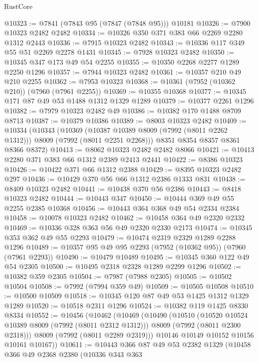 \begin{lexlean}{RustCore}
\begin{coremodule}
@10323 := @7841 (@7843 @95 (@7847 (@7848 @95))) @10181
@10326 := @7900 @10323 @2482 @2482
@10334 := @10326 @350 @371 @383 @66 @2269 @2280 @1312 @2443
@10336 := @7915 @10323 @2482
@10343 := @10336 @117 @349 @55 @51 @2269 @2278 @1431
@10345 := @7928 @10323 @2482
@10350 := @10345 @347 @173 @49 @54 @2255
@10355 := @10350 @2268 @2277 @1289 @2250 @1296
@10357 := @7944 @10323 @2482
@10361 := @10357 @210 @49 @210 @2255
@10362 := @7953 @10323
@10368 := @10361 (@7952 (@10362 @210)) (@7960 (@7961 @2255))
@10369 := @10355 @10368
@10377 := @10345 @171 @87 @49 @53 @1488 @1312 @1329 @1289
@10379 := @10377 @2261 @1296
@10382 := @7979 @10323 @2482 @49
@10386 := @10382 @170 @1488 @8709 @8713
@10387 := @10379 @10386
@10389 := @8003 @10323 @2482
@10409 := @10334
    (@10343
      (@10369 (@10387 @10389 @8009 (@7992 (@8011 @2262 @1312))) @8009 (@7992 (@8011 @2251 @2268)))
      @8351
      @8354
      @8357
      @8361
      @8366
      @8372)
@10413 := @8062 @10323 @2482 @2482 @8066
@10421 := @10413 @2280 @371 @383 @66 @1312 @2389 @2413 @2441
@10422 := @8386 @10323
@10426 := @10422 @371 @66 @1312 @2388
@10429 := @8395 @10323 @2482 @297
@10436 := @10429 @370 @56 @66 @1312 @2386 @1333 @831
@10438 := @8409 @10323 @2482
@10441 := @10438 @370 @56 @2386
@10443 := @8418 @10323 @2482
@10444 := @10443 @347
@10450 := @10444 @369 @49 @55 @2255 @2385 @10368
@10456 := @10443 @364 @368 @49 @54 @2334 @2384
@10458 := @10078 @10323 @2482
@10462 := @10458 @364 @49 @2320 @2332
@10469 := @10336 @328 @363 @56 @49 @2320 @2330 @2173
@10474 := @10345 @353 @362 @49 @55 @2293
@10479 := @10474 @2319 @2329 @1289 @2288 @1296
@10489 := @10357 @95 @49 @95 @2293 (@7952 (@10362 @95)) (@7960 (@7961 @2293))
@10490 := @10479 @10489
@10495 := @10345 @360 @122 @49 @54 @2305
@10500 := @10495 @2318 @2328 @1289 @2299 @1296
@10502 := @10382 @359 @2305
@10504 := @7987 (@7988 @2305)
@10505 := @10502 @10504
@10508 := @7992 (@7994 @359 @49)
@10509 := @10505 @10508
@10510 := @10500 @10509
@10518 := @10345 @120 @87 @49 @53 @1425 @1312 @1329 @1289
@10520 := @10518 @2311 @1296
@10524 := @10382 @119 @1425 @8330 @8334
@10552 := @10456
    (@10462
      (@10469
        (@10490
          (@10510
            (@10520 @10524 @10389 @8009 (@7992 (@8011 @2312 @1312)))
            @8009
            (@7992 (@8011 @2300 @2318)))
          @8009
          (@7992 (@8011 @2289 @2319)))
        @10146
        @10149
        @10152
        @10156
        @10161
        @10167))
@10611 := @10443
    @366
    @87
    @49
    @53
    @2382
    @1329
    (@10458
      @366
      @49
      @2368
      @2380
      (@10336
        @343
        @363

\end{coremodule}
\end{lexlean}
